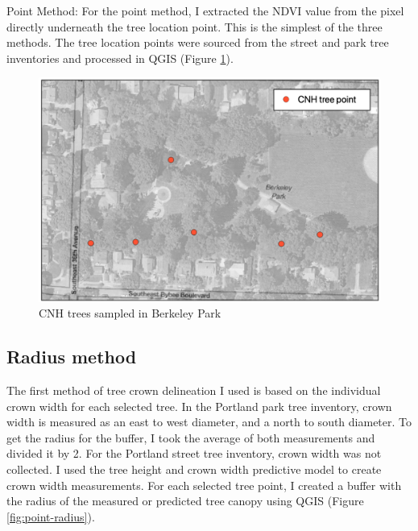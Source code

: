 \documentclass[12pt,twoside]{reedthesis}
\begin{document}
Point Method: For the point method, I extracted the NDVI value from the pixel directly underneath the tree location point. This is the simplest of the three methods. The tree location points were sourced from the street and park tree inventories and processed in QGIS (Figure \ref{fig:point-method}).
\begin{figure}

{\centering \includegraphics[width=1\linewidth]{figure/points} 

}

\caption{CNH trees sampled in Berkeley Park}\label{fig:point-method}
\end{figure}
\hypertarget{radius-method}{%
\subsection{Radius method}\label{radius-method}}

The first method of tree crown delineation I used is based on the individual crown width for each selected tree. In the Portland park tree inventory, crown width is measured as an east to west diameter, and a north to south diameter. To get the radius for the buffer, I took the average of both measurements and divided it by 2. For the Portland street tree inventory, crown width was not collected. I used the tree height and crown width predictive model to create crown width measurements. For each selected tree point, I created a buffer with the radius of the measured or predicted tree canopy using QGIS (Figure \ref{fig:point-radius}).
\end{document}
